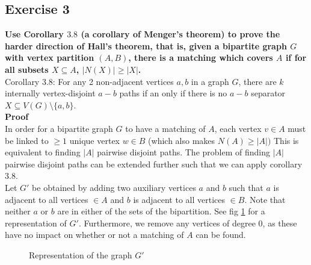 \subsection*{Exercise 3}
\boldmath
\textbf{Use Corollary $3.8$ (a corollary of Menger’s theorem) to prove the harder direction of Hall’s theorem, that is, given a bipartite graph $G$ with vertex partition $(A,B)$, there is a matching which covers $A$ if for all subsets $X \subseteq A$, $|N(X)| \geq |X|$.\\\linebreak} 
\unboldmath
Corollary 3.8: For any 2 non-adjacent vertices $a,b$ in a graph $G$, there are $k$ internally vertex-disjoint $a-b$ paths if an only if there is no $a-b$ separator $X \subseteq V(G)\setminus \{a, b\}$. \\
\linebreak 
\textbf{Proof} \\
In order for a bipartite graph $G$ to have a matching of $A$, each vertex $v \in A$ must be linked to $\geq 1$ unique vertex $w \in B$ (which also makes $N(A) \geq |A|)$ This is equivalent to finding $|A|$ pairwise disjoint paths. The problem of finding $|A|$ pairwise disjoint paths can be extended further such that we can apply corollary 3.8. \\
\linebreak 
Let $G'$ be obtained by adding two auxiliary vertices $a$ and $b$ such that $a$ is adjacent to all vertices $\in A$ and $b$ is adjacent to all vertices $\in B$. Note that neither $a$ or $b$ are in either of the sets of the bipartition. See fig \ref{fig:bip} for a representation of $G'$. Furthermore, we remove any vertices of degree 0, as these have no impact on whether or not a matching of $A$ can be found. \\
    \begin{figure}[h]
        \centering
        \caption{Representation of the graph $G'$}
        \label{fig:bip}
    \end{figure}
